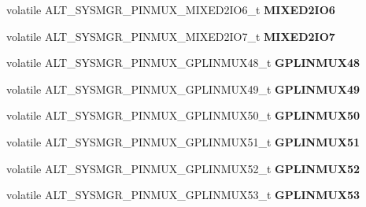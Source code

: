 \begin{DoxyCompactItemize}
volatile A\+L\+T\+\_\+\+S\+Y\+S\+M\+G\+R\+\_\+\+P\+I\+N\+M\+U\+X\+\_\+\+M\+I\+X\+E\+D2\+I\+O6\+\_\+t {\bfseries M\+I\+X\+E\+D2\+I\+O6}
\item 
\mbox{\label{structALT__SYSMGR__PINMUX__s_a40c26da1c084d5cd533ad8c77d51eaf3}} 
volatile A\+L\+T\+\_\+\+S\+Y\+S\+M\+G\+R\+\_\+\+P\+I\+N\+M\+U\+X\+\_\+\+M\+I\+X\+E\+D2\+I\+O7\+\_\+t {\bfseries M\+I\+X\+E\+D2\+I\+O7}
\item 
\mbox{\label{structALT__SYSMGR__PINMUX__s_adefa046f9348420c8d583e91cffcecc3}} 
volatile A\+L\+T\+\_\+\+S\+Y\+S\+M\+G\+R\+\_\+\+P\+I\+N\+M\+U\+X\+\_\+\+G\+P\+L\+I\+N\+M\+U\+X48\+\_\+t {\bfseries G\+P\+L\+I\+N\+M\+U\+X48}
\item 
\mbox{\label{structALT__SYSMGR__PINMUX__s_a91d543d145fc182e441a14a79b524e5d}} 
volatile A\+L\+T\+\_\+\+S\+Y\+S\+M\+G\+R\+\_\+\+P\+I\+N\+M\+U\+X\+\_\+\+G\+P\+L\+I\+N\+M\+U\+X49\+\_\+t {\bfseries G\+P\+L\+I\+N\+M\+U\+X49}
\item 
\mbox{\label{structALT__SYSMGR__PINMUX__s_acdf4e8346c746be008c923d73b051092}} 
volatile A\+L\+T\+\_\+\+S\+Y\+S\+M\+G\+R\+\_\+\+P\+I\+N\+M\+U\+X\+\_\+\+G\+P\+L\+I\+N\+M\+U\+X50\+\_\+t {\bfseries G\+P\+L\+I\+N\+M\+U\+X50}
\item 
\mbox{\label{structALT__SYSMGR__PINMUX__s_abd15c625b544aa687bf8e416d19e809a}} 
volatile A\+L\+T\+\_\+\+S\+Y\+S\+M\+G\+R\+\_\+\+P\+I\+N\+M\+U\+X\+\_\+\+G\+P\+L\+I\+N\+M\+U\+X51\+\_\+t {\bfseries G\+P\+L\+I\+N\+M\+U\+X51}
\item 
\mbox{\label{structALT__SYSMGR__PINMUX__s_a4007826dbfb2bdfa06b055c4296fd2d8}} 
volatile A\+L\+T\+\_\+\+S\+Y\+S\+M\+G\+R\+\_\+\+P\+I\+N\+M\+U\+X\+\_\+\+G\+P\+L\+I\+N\+M\+U\+X52\+\_\+t {\bfseries G\+P\+L\+I\+N\+M\+U\+X52}
\item 
\mbox{\label{structALT__SYSMGR__PINMUX__s_a522bf18c072b08a9d2092b55b25122e1}} 
volatile A\+L\+T\+\_\+\+S\+Y\+S\+M\+G\+R\+\_\+\+P\+I\+N\+M\+U\+X\+\_\+\+G\+P\+L\+I\+N\+M\+U\+X53\+\_\+t {\bfseries G\+P\+L\+I\+N\+M\+U\+X53}
\item 
\mbox{\label{structALT__SYSMGR__PINMUX__s_a4b2c312a4c2251930e3391d9efcfde58}} 

\end{DoxyCompactItemize}
